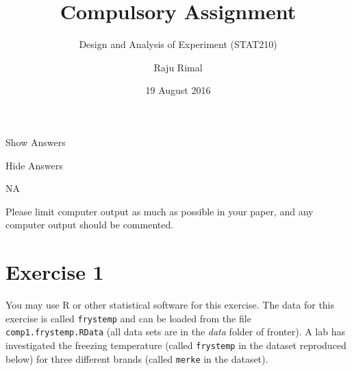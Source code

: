 \documentclass[11pt,a4paper]{article}
\title{Compulsory Assignment}
\subtitle{Design and Analysis of Experiment (STAT210)}
\author{Raju Rimal}
\date{19 August 2016}
\begin{document}
\maketitle

Show Answers

Hide Answers

NA

Please limit computer output as much as possible in your paper, and any
computer output should be commented.

\section{Exercise 1}\label{exercise-1}

You may use R or other statistical software for this exercise. The data
for this exercise is called \texttt{frystemp} and can be loaded from the
file \texttt{comp1.frystemp.RData} (all data sets are in the \emph{data}
folder of fronter). A lab has investigated the freezing temperature
(called \texttt{frystemp} in the dataset reproduced below) for three
different brands (called \texttt{merke} in the dataset).
\end{document}
